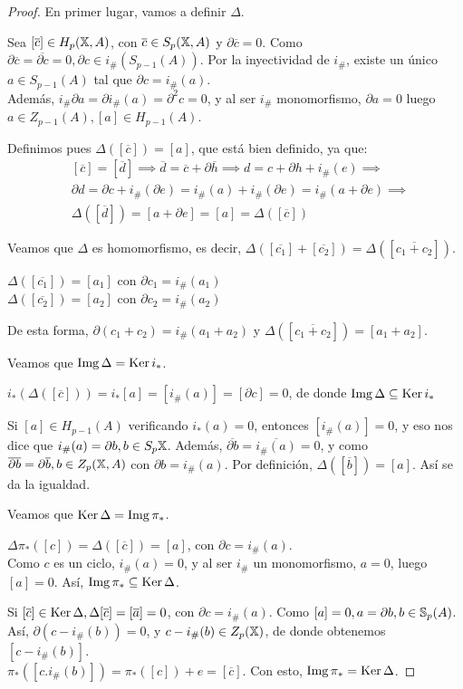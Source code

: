 \begin{proof}
  En primer lugar, vamos a definir $\Delta$.

  Sea $[\overline{c}] \in H_p(\X, A)$, con $\overline{c} \in S_p(\X, A)$ y $\partial \overline{c} = 0$. Como $\partial \overline{c} = \overline{\partial c} = 0,
  \partial c \in i_\#(S_{p-1}(A))$. Por la inyectividad de $i_\#$, existe un único $a \in S_{p-1}(A)$ tal que $\partial c = i_\#(a)$. \\
  Además, $i_\# \partial a = \partial i_\#(a) = \partial^2 c = 0$, y al ser $i_\#$ monomorfismo, $\partial a = 0$ luego $a \in Z_{p-1}(A), [a] \in H_{p-1}(A)$.

  Definimos pues $\Delta([\overline{c}]) = [a]$, que está bien definido, ya que:
  \begin{align*}
    &[\overline{c}] = [\overline{d}] \implies \overline{d} = \overline{c} + \partial \overline{h} \implies d = c + \partial h + i_\#(e) \implies \\
    &\partial d = \partial c + i_\#(\partial e) = i_\#(a) + i_\#(\partial e) = i_\#(a + \partial e) \implies \\
    &\Delta([\overline{d}]) = [a + \partial e] = [a] = \Delta([\overline{c}])
  \end{align*}

  Veamos que $\Delta$ es homomorfismo, es decir, $\Delta([\overline{c_1}] + [\overline{c_2}]) = \Delta([\overline{c_1 + c_2}])$.

  $\Delta([\overline{c_1}]) = [a_1]$ con $\partial c_1 = i_\#(a_1)$ \\
  $\Delta([\overline{c_2}]) = [a_2]$ con $\partial c_2 = i_\#(a_2)$

  De esta forma, $\partial(c_1 + c_2) = i_\#(a_1 + a_2)$ y $\Delta([\overline{c_1 + c_2}]) = [a_1 + a_2]$.

  Veamos que $\Img \Delta = \Ker i_*$.

  $i_*(\Delta([\overline{c}])) = i_*[a] = [i_\#(a)] = [\partial c] = 0$, de donde $\Img \Delta \subseteq \Ker i_*$

  Si $[a] \in H_{p-1}(A)$ verificando $i_*(a) = 0$, entonces $[i_\#(a)] = 0$, y eso nos dice que $i_\#(a) = \partial b, b \in S_p{\X}$.
  Además, $\overline{\partial b} = \overline{i_\#(a)} = 0$, y como $\overline{\partial b} = \partial \overline{b}, b \in Z_p(\X, A)$ con
  $\partial b = i_\#(a)$. Por definición, $\Delta([\overline{b}]) = [a]$. Así se da la igualdad.

  Veamos que $\Ker \Delta = \Img \pi_*$.

  $\Delta\pi_*([c]) = \Delta([\overline{c}]) = [a]$, con $\partial c = i_\#(a)$. \\
  Como $c$ es un ciclo, $i_\#(a) = 0$, y al ser $i_\#$ un monomorfismo, $a = 0$, luego $[a] = 0$. Así, $\Img \pi_* \subseteq \Ker \Delta$.

  Si $[\overline{c}] \in \Ker \Delta, \Delta[\overline{c}] = [\overline{a}] = 0$, con $\partial c = i_\#(a)$. Como $[a] = 0, a = \partial b, b \in \S_p(A)$.
  Así, $\partial(c - i_\#(b)) = 0$, y $c - i_\#(b) \in Z_p(\X)$, de donde obtenemos $[c - i_\#(b)]$. \\
  $\pi_*([c . i_\#(b)]) = \pi_*([c]) + e = [\overline{c}]$. Con esto, $\Img \pi_* = \Ker \Delta$.
\end{proof}

